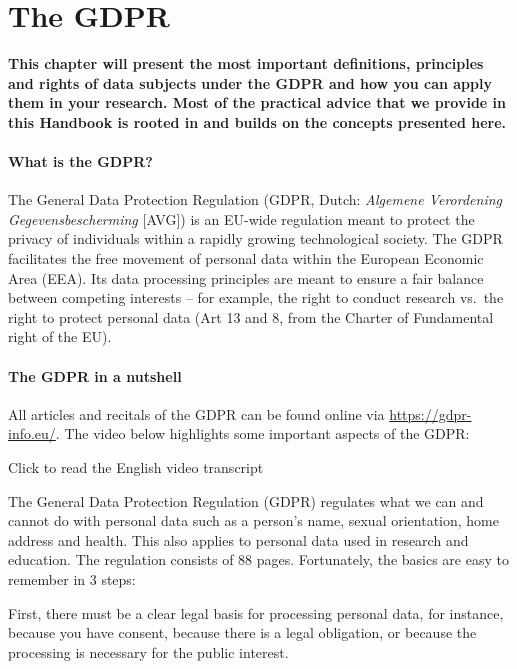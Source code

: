 \documentclass[
]{book}
\begin{document}
\hypertarget{gdpr}{%
\chapter*{The GDPR}\label{gdpr}}

\textbf{This chapter will present the most important definitions, principles and rights of data subjects
under the GDPR and how you can apply them in your research. Most of the practical advice that we
provide in this Handbook is rooted in and builds on the concepts presented here.}

\hypertarget{what-is-the-gdpr}{%
\subsubsection{What is the GDPR?}\label{what-is-the-gdpr}}

The General Data Protection Regulation (GDPR, Dutch: \emph{Algemene Verordening Gegevensbescherming} {[}AVG{]})
is an EU-wide regulation meant to protect the privacy of individuals within a rapidly growing technological
society. The GDPR facilitates the free movement of personal data within the European Economic Area (EEA).
Its data processing principles are meant to ensure a fair balance between competing interests -- for example,
the right to conduct research vs.~the right to protect personal data (Art 13 and 8, from the Charter of
Fundamental right of the EU).

\hypertarget{the-gdpr-in-a-nutshell}{%
\subsubsection{The GDPR in a nutshell}\label{the-gdpr-in-a-nutshell}}

All articles and recitals of the GDPR can be found online via \url{https://gdpr-info.eu/}.
The video below highlights some important aspects of the GDPR:

Click to read the English video transcript

The General Data Protection Regulation (GDPR) regulates what we can and cannot do
with personal data such as a person's name, sexual orientation, home address and health.
This also applies to personal data used in research and education. The regulation consists
of 88 pages. Fortunately, the basics are easy to remember in 3 steps:

First, there must be a clear legal basis for processing personal data, for instance,
because you have consent, because there is a legal obligation, or because the processing is
necessary for the public interest.
\end{document}
